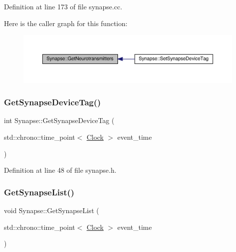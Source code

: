 Definition at line 173 of file synapse.\+cc.

Here is the caller graph for this function\+:\nopagebreak
\begin{figure}[H]
\begin{center}
\leavevmode
\includegraphics[width=350pt]{class_synapse_a16d2d8025a2955be987731990309316a_icgraph}
\end{center}
\end{figure}
\mbox{\label{class_synapse_a4fe6b49e46ebda6f34593d3df54d5593}} 
\subsubsection{\texorpdfstring{Get\+Synapse\+Device\+Tag()}{GetSynapseDeviceTag()}}
{\footnotesize\ttfamily int Synapse\+::\+Get\+Synapse\+Device\+Tag (\begin{DoxyParamCaption}\item[{std\+::chrono\+::time\+\_\+point$<$ \hyperlink{universe_8h_a0ef8d951d1ca5ab3cfaf7ab4c7a6fd80}{Clock} $>$}]{event\+\_\+time }\end{DoxyParamCaption})\hspace{0.3cm}{\ttfamily [inline]}}



Definition at line 48 of file synapse.\+h.

\mbox{\label{class_synapse_a63f214e8ccef1f6625d5fecd36104efe}} 
\subsubsection{\texorpdfstring{Get\+Synapse\+List()}{GetSynapseList()}}
{\footnotesize\ttfamily void Synapse\+::\+Get\+Synapse\+List (\begin{DoxyParamCaption}\item[{std\+::chrono\+::time\+\_\+point$<$ \hyperlink{universe_8h_a0ef8d951d1ca5ab3cfaf7ab4c7a6fd80}{Clock} $>$}]{event\+\_\+time }\end{DoxyParamCaption})}

